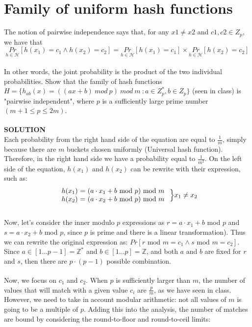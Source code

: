 \documentclass[a4paper]{article}
\begin{document}
\section*{Family of uniform hash functions}
The notion of pairwise independence says that, for any $x1 \neq x2$ and $c1, c2 \in Z_p$, we have that
\[
\underset{h \in \mathcal{H}}{Pr}[h(x_1) = c_1 \wedge h(x_2) = c_2] = \underset{h \in \mathcal{H}}{Pr}[h(x_1) = c_1] \times \underset{h \in \mathcal{H}}{Pr}[h(x_2) = c_2] 
\]\qquad \\
In other words, the joint probability is the product of the two individual probabilities. Show that the family of hash functions $H = \{ h_{ab}(x) = ((ax + b) \ mod \ p)\ mod \ m \ : a \in Z^*_p, b \in Z_p\}$ (seen in class) is "pairwise independent", where $p$ is a sufficiently large prime number $(m + 1 \leq p \leq 2m)$.
\\
\\
\textbf{SOLUTION}
\\
Each probability from the right hand side of the equation are equal to
\(\frac{1}{m}\), simply because there are \(m\) buckets chosen uniformly (Universal hash function).
Therefore, in the right hand side
we have a probability equal to \(\frac{1}{m^2}\). On the left side of the equation, \(h(x_1)\) 
and \(h(x_2)\) can be rewrite with their expression, such as:
\[
\left.
\begin{array}{l}
\text{$h(x_1)$ = ($a \cdot x_1 + b$ mod $p$) mod $m$}\\
\text{$h(x_2)$ = ($a \cdot x_2 + b$ mod $p$) mod $m$}
\end{array}
\right. \Bigl\}
x_1 \ne x_2
\]
\qquad \\
Now, let's consider the inner modulo \(p\) expressions as \(r = a\cdot x_1 + b\) mod
\(p\) and \(s = a \cdot x_2 + b\) mod \(p\), since $p$ is prime and there is a linear transformation). 
Thus we can rewrite the original expression as: \({Pr}[r \text{ mod } m = c_1 \wedge s \text{ mod } m = c_2]\). Since
$a \in [1 \dots p-1]=\mathbb{Z}^*$ and $b \in [1 \dots p]=\mathbb{Z}$, and both \(a\) and \(b\) are fixed for \(r\) and \(s\), then there are \(p\cdot(p-1)\) possible combination. \\
\qquad \\
Now, we focus on \(c_1\) and \(c_2\). When \(p\) is sufficiently
larger than \(m\), the number of values that will match with a given
value \(c_i\) are \(\frac{p}{m}\), as we have seen in class. 
However, we need to take in account modular arithmetic: not all values of \(m\)
is going to be a multiple of \(p\). Adding this into the
analysis, the number of matches are bound by considering the
round-to-floor and round-to-ceil limits:
\end{document}
